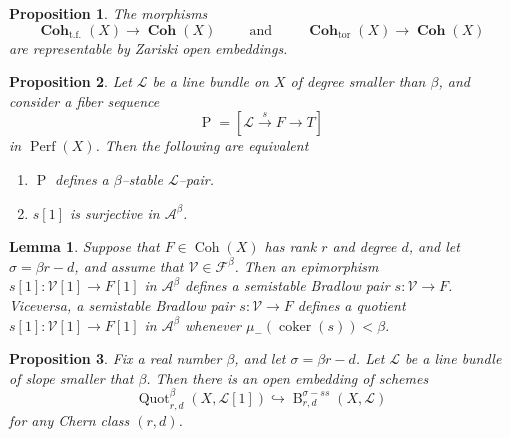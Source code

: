 \documentclass[10pt,a4paper]{amsart}
\newtheorem{proposition}{Proposition}
\newtheorem{lemma}{Lemma}
\newcommand{\Quotbetaonerd}{\operatorname{Quot}_{r,d}^{\beta}(X,\mathcal{L}[1])}
\newcommand{\abeta}{\mathcal{A}^{\beta}}
\newcommand{\bradlb}{\operatorname{{B}}^{\sigma - ss}_{r,d}(X,\mathcal{L})}
\newcommand{\coh}{\operatorname{Coh}}
\newcommand{\cohflat}{\boldsymbol{\operatorname{Coh}}}
\newcommand{\fbeta}{\mathcal{F}^{\beta}}
\newcommand{\fbetastack}{\boldsymbol{\operatorname{Coh}}_{\operatorname{t.f.}}(X)}
\newcommand{\framing}{\mathcal{V}}
\newcommand{\linebundle}{\mathcal{L}}
\newcommand{\perf}{\operatorname{Perf}(X)}
\newcommand{\tbetastack}{\boldsymbol{\operatorname{Coh}}_{\operatorname{tor}}(X)}
\begin{document}
\begin{proposition}\label{prop : open tp}
    The morphisms
    \begin{equation}\label{eqn : embeddings of tbeta and fbeta}
        \fbetastack \rightarrow \cohflat(X) \hspace{1cm} \text{and} \hspace{1cm} \tbetastack\rightarrow\cohflat(X)
    \end{equation}
    are representable by Zariski open embeddings.
\end{proposition}

    \begin{proposition}\label{prop : PairsQuot}
    Let $\linebundle$ be a line bundle on $X$ of degree smaller than $\beta$, and consider a fiber sequence
    \[
      \operatorname{P}=[\linebundle \xrightarrow{s} F\rightarrow T]  
    \]
    in $\perf$. Then the following are equivalent
    \begin{enumerate}
        \item\label{item : stpair} $\operatorname{P}$ defines a $\beta$--stable $\linebundle$--pair.
        \item\label{item : quotient} $s[1]$ is surjective in $\abeta$.
    \end{enumerate}
    
    \end{proposition}

\begin{lemma}\label{lem : bradlow vs quot}
    Suppose that $F \in \coh(X)$ has rank $r$ and degree $d$, and let $\sigma = \beta r - d$, and assume that $\framing \in \fbeta$. Then an epimorphism $s[1] \colon \framing[1] \rightarrow F[1]$ in $\abeta$ defines a semistable Bradlow pair $s \colon \framing \rightarrow F$. Viceversa, a semistable Bradlow pair $s \colon \framing \rightarrow F$ defines a quotient $s[1] \colon \framing[1] \rightarrow F[1]$ in $\abeta$ whenever $\mu_-(\operatorname{coker}(s)) < \beta$. 
\end{lemma}

\begin{proposition}\label{prop : BradlowQuot}
    Fix a real number $\beta$, and let $\sigma = \beta r - d$. Let $\linebundle$ be a line bundle of slope smaller that $\beta$. Then there is an open embedding of schemes
    \[
        \Quotbetaonerd \hookrightarrow \bradlb 
    \]
    for any Chern class $(r,d)$.
\end{proposition}
\end{document}
